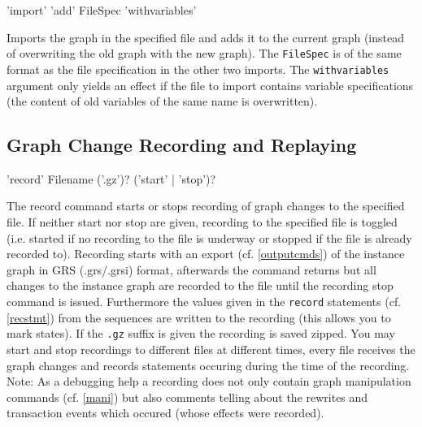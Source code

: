 \begin{rail}
  'import' 'add' FileSpec 'withvariables'
\end{rail}
Imports the graph in the specified file and adds it to the current graph
(instead of overwriting the old graph with the new graph).
The \texttt{FileSpec} is of the same format as the file specification in the other two imports.
The \texttt{withvariables} argument only yields an effect if the file to import contains variable specifications (the content of old variables of the same name is overwritten).

\subsection{Graph Change Recording and Replaying}
\label{recordnreplay}

\begin{rail}
  'record' Filename ('.gz')? ('start' | 'stop')?
\end{rail}
The record command starts or stops recording of graph changes to the specified file. If neither start nor stop are given, recording to the specified file is toggled (i.e. started if no recording to the file is underway or stopped if the file is already recorded to).
Recording starts with an export (cf. \ref{outputcmds}) of the instance graph in GRS (.grs/.grsi) format, afterwards the command returns but all changes to the instance graph are recorded to the file until the recording stop command is issued.
Furthermore the values given in the \texttt{record} statements (cf. \ref{recstmt}) from the sequences are written to the recording (this allows you to mark states).
If the \texttt{.gz} suffix is given the recording is saved zipped.
You may start and stop recordings to different files at different times, every file receives the graph changes and records statements occuring during the time of the recording.
Note: As a debugging help a recording does not only contain graph manipulation commands (cf. \ref{mani}) but also comments telling about the rewrites and transaction events which occured (whose effects were recorded).

